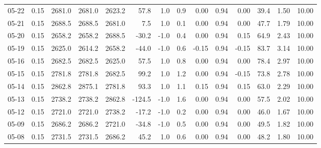 \begin{threeparttable}
{\begin{tabular}{lrrrrrrrrrrrrr}
  05-22 &     0.15 & 2681.0 & 2681.0 & 2623.2 &       57.8 &                      1.0 &                 0.9 &       0.00 &      0.94 &           0.00 &             39.4 &            1.50 &                  10.00 \\
  05-21 &     0.15 & 2688.5 & 2688.5 & 2681.0 &        7.5 &                      1.0 &                 0.1 &       0.00 &      0.94 &           0.00 &             47.7 &            1.79 &                  10.00 \\
  05-20 &     0.15 & 2658.2 & 2658.2 & 2688.5 &      -30.2 &                     -1.0 &                 0.4 &       0.00 &      0.94 &           0.15 &             64.9 &            2.43 &                  10.00 \\
  05-19 &     0.15 & 2625.0 & 2614.2 & 2658.2 &      -44.0 &                     -1.0 &                 0.6 &      -0.15 &      0.94 &          -0.15 &             83.7 &            3.14 &                  10.00 \\
  05-16 &     0.15 & 2682.5 & 2682.5 & 2625.0 &       57.5 &                      1.0 &                 0.8 &       0.00 &      0.94 &           0.00 &             78.4 &            2.97 &                  10.00 \\
  05-15 &     0.15 & 2781.8 & 2781.8 & 2682.5 &       99.2 &                      1.0 &                 1.2 &       0.00 &      0.94 &          -0.15 &             73.8 &            2.78 &                  10.00 \\
  05-14 &     0.15 & 2862.8 & 2875.1 & 2781.8 &       93.3 &                      1.0 &                 1.1 &       0.15 &      0.94 &           0.15 &             63.0 &            2.29 &                  10.00 \\
  05-13 &     0.15 & 2738.2 & 2738.2 & 2862.8 &     -124.5 &                     -1.0 &                 1.6 &       0.00 &      0.94 &           0.00 &             57.5 &            2.02 &                  10.00 \\
  05-12 &     0.15 & 2721.0 & 2721.0 & 2738.2 &      -17.2 &                     -1.0 &                 0.2 &       0.00 &      0.94 &           0.00 &             46.0 &            1.67 &                  10.00 \\
  05-09 &     0.15 & 2686.2 & 2686.2 & 2721.0 &      -34.8 &                     -1.0 &                 0.5 &       0.00 &      0.94 &           0.00 &             49.5 &            1.82 &                  10.00 \\
  05-08 &     0.15 & 2731.5 & 2731.5 & 2686.2 &       45.2 &                      1.0 &                 0.6 &       0.00 &      0.94 &           0.00 &             48.2 &            1.80 &                  10.00 \\

\end{tabular}}
\end{threeparttable}
